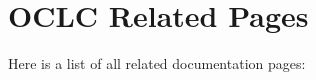 \section{OCLC Related Pages}
Here is a list of all related documentation pages:\begin{CompactList}
\item {}

\end{CompactList}
